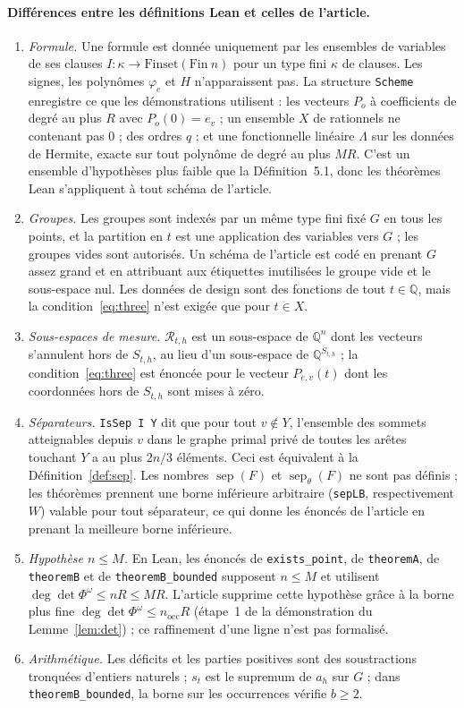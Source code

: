 \documentclass[11pt,a4paper]{article}
\theoremstyle{definition}
\theoremstyle{remark}
\newcommand{\Q}{\mathbb{Q}}
\newcommand{\cR}{\mathcal{R}}
\newcommand{\sep}{\operatorname{sep}}
\newcommand{\sepw}{\operatorname{sep}_{\theta}}
\newcommand{\nocc}{n_{\mathrm{occ}}}
\begin{document}
\paragraph{Différences entre les définitions Lean et celles de l'article.}
\begin{enumerate}
\item \emph{Formule.} Une formule est donnée uniquement par les ensembles de variables de ses
 clauses $I:\kappa\to\mathrm{Finset}(\mathrm{Fin}\ n)$ pour un type fini $\kappa$ de
 clauses. Les signes, les polynômes $\varphi_e$ et $H$ n'apparaissent pas. La structure
 \texttt{Scheme} enregistre ce que les démonstrations utilisent : les vecteurs $P_o$ à
 coefficients de degré au plus $R$ avec $P_o(0)=e_v$ ; un ensemble $X$ de rationnels ne
 contenant pas $0$ ; des ordres $q$ ; et une fonctionnelle linéaire $\Lambda$ sur les
 données de Hermite, exacte sur tout polynôme de degré au plus $MR$. C'est un ensemble
 d'hypothèses plus faible que la Définition~5.1, donc les théorèmes Lean s'appliquent à tout
 schéma de l'article.
\item \emph{Groupes.} Les groupes sont indexés par un même type fini fixé $G$ en tous les
 points, et la partition en $t$ est une application des variables vers $G$ ; les groupes
 vides sont autorisés. Un schéma de l'article est codé en prenant $G$ assez grand et en
 attribuant aux étiquettes inutilisées le groupe vide et le sous-espace nul. Les données de
 design sont des fonctions de tout $t\in\Q$, mais la condition~\eqref{eq:three} n'est
 exigée que pour $t\in X$.
\item \emph{Sous-espaces de mesure.} $\cR_{t,h}$ est un sous-espace de $\Q^n$ dont les
 vecteurs s'annulent hors de $S_{t,h}$, au lieu d'un sous-espace de $\Q^{S_{t,h}}$ ; la
 condition~\eqref{eq:three} est énoncée pour le vecteur $P_{e,v}(t)$ dont les coordonnées
 hors de $S_{t,h}$ sont mises à zéro.
\item \emph{Séparateurs.} \texttt{IsSep I Y} dit que pour tout $v\notin Y$, l'ensemble des
 sommets atteignables depuis $v$ dans le graphe primal privé de toutes les arêtes touchant
 $Y$ a au plus $2n/3$ éléments. Ceci est équivalent à la Définition~\ref{def:sep}. Les
 nombres $\sep(F)$ et $\sepw(F)$ ne sont pas définis ; les théorèmes prennent une borne
 inférieure arbitraire (\texttt{sepLB}, respectivement $W$) valable pour tout séparateur, ce
 qui donne les énoncés de l'article en prenant la meilleure borne inférieure.
\item \emph{Hypothèse $n\le M$.} En Lean, les énoncés de \texttt{exists\_point}, de
 \texttt{theoremA}, de \texttt{theoremB} et de \texttt{theoremB\_bounded} supposent
 $n\le M$ et utilisent $\deg\det\Phi^\omega\le nR\le MR$. L'article supprime cette hypothèse grâce à la
 borne plus fine $\deg\det\Phi^\omega\le\nocc R$ (étape~1 de la démonstration du
 Lemme~\ref{lem:det}) ; ce raffinement d'une ligne n'est pas formalisé.
\item \emph{Arithmétique.} Les déficits et les parties positives sont des soustractions
 tronquées d'entiers naturels ; $s_t$ est le supremum de $a_h$ sur $G$ ; dans
 \texttt{theoremB\_bounded}, la borne sur les occurrences vérifie $b\ge2$.
\end{enumerate}
\end{document}
